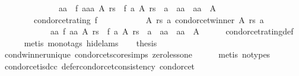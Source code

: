 \begin{isabellebody}
\ \ \ \ \ \ \ \ \ \ \ \ \ \ {\isacharparenleft}{\kern0pt}{\isasymexists}aa{\isachardot}{\kern0pt}\ {\isasymnot}\ f\ {\isacharparenleft}{\kern0pt}aa{\isacharcolon}{\kern0pt}{\isacharcolon}{\kern0pt}{\isacharprime}{\kern0pt}a{\isacharparenright}{\kern0pt}\ A\ rs\ {\isacharless}{\kern0pt}\ f\ a\ A\ rs\ {\isasymand}\ a\ {\isasymnoteq}\ aa\ {\isasymand}\ aa\ {\isasymin}\ A{\isacharparenright}{\kern0pt}{\isacharparenright}{\kern0pt}{\isacharparenright}{\kern0pt}\ {\isasymand}\isanewline
\ \ \ \ \ \ \ \ {\isacharparenleft}{\kern0pt}condorcet{\isacharunderscore}{\kern0pt}rating\ f\ {\isasymlongrightarrow}\isanewline
\ \ \ \ \ \ \ \ \ \ {\isacharparenleft}{\kern0pt}{\isasymforall}A\ rs\ a{\isachardot}{\kern0pt}\ condorcet{\isacharunderscore}{\kern0pt}winner\ A\ rs\ a\ {\isasymlongrightarrow}\isanewline
\ \ \ \ \ \ \ \ \ \ \ \ {\isacharparenleft}{\kern0pt}{\isasymforall}aa{\isachardot}{\kern0pt}\ f\ aa\ A\ rs\ {\isacharless}{\kern0pt}\ f\ a\ A\ rs\ {\isasymor}\ a\ {\isacharequal}{\kern0pt}\ aa\ {\isasymor}\ aa\ {\isasymnotin}\ A{\isacharparenright}{\kern0pt}{\isacharparenright}{\kern0pt}{\isacharparenright}{\kern0pt}{\isachardoublequoteclose}\isanewline
\ \ \ \ \isamarkupfalse%
\ condorcet{\isacharunderscore}{\kern0pt}rating{\isacharunderscore}{\kern0pt}def\isanewline
\ \ \ \ \isamarkupfalse%
\ {\isacharparenleft}{\kern0pt}metis\ {\isacharparenleft}{\kern0pt}mono{\isacharunderscore}{\kern0pt}tags{\isacharcomma}{\kern0pt}\ hide{\isacharunderscore}{\kern0pt}lams{\isacharparenright}{\kern0pt}{\isacharparenright}{\kern0pt}\isanewline
\ \ \isamarkupfalse%
\ {\isacharquery}{\kern0pt}thesis\isanewline
\ \ \ \ \isamarkupfalse%
\ cond{\isacharunderscore}{\kern0pt}winner{\isacharunderscore}{\kern0pt}unique\ condorcet{\isacharunderscore}{\kern0pt}score{\isachardot}{\kern0pt}simps\ zero{\isacharunderscore}{\kern0pt}less{\isacharunderscore}{\kern0pt}one\isanewline
\ \ \ \ \isamarkupfalse%
\ {\isacharparenleft}{\kern0pt}metis\ {\isacharparenleft}{\kern0pt}no{\isacharunderscore}{\kern0pt}types{\isacharparenright}{\kern0pt}{\isacharparenright}{\kern0pt}\isanewline
{}\isamarkupfalse%
%
\endisatagproof
{\isafoldproof}%
%
\isadelimproof
\isanewline
%
\endisadelimproof
\isanewline
{}\isamarkupfalse%
\ condorcet{\isacharunderscore}{\kern0pt}is{\isacharunderscore}{\kern0pt}dcc{\isacharcolon}{\kern0pt}\ {\isachardoublequoteopen}defer{\isacharunderscore}{\kern0pt}condorcet{\isacharunderscore}{\kern0pt}consistency\ condorcet{\isachardoublequoteclose}\isanewline
%
\isadelimproof

\end{isabellebody}

